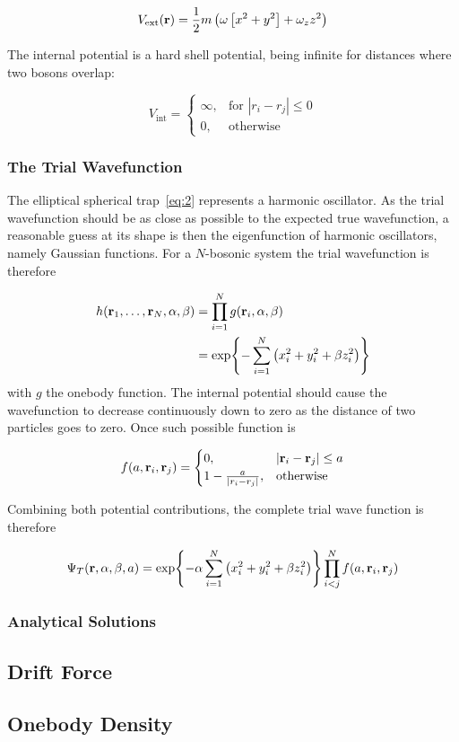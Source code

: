 \begin{equation}
  \label{eq:2}
  V_{\text{ext}}(\vb{r}) = \frac{1}{2}m\left( \omega\left[ x^{2} + y^{2} \right] + \omega_{z}z^{2} \right)
\end{equation}

The internal potential is a hard shell potential, being infinite for distances
where two bosons overlap:

\begin{equation*}
  V_{\text{int}} = \begin{cases}
    \infty, &\text{for } |r_{i} - r_{j}| \le 0\\
    0, &\text{otherwise}
    \end{cases}
\end{equation*}

\subsubsection{The Trial Wavefunction}

The elliptical spherical trap~\eqref{eq:2} represents a harmonic oscillator. As
the trial wavefunction should be as close as possible to the expected true
wavefunction, a reasonable guess at its shape is then the eigenfunction of
harmonic oscillators, namely Gaussian functions. For a \(N\)-bosonic system the
trial wavefunction is therefore

\begin{align*}
  h(\vb{r}_{1}, \ldots, \vb{r}_{N}, \alpha, \beta) &= \prod_{i=1}^{N}g(\vb{r}_{i}, \alpha, \beta)\\
  &= \exp{-\sum_{i=1}^{N}\left( x_{i}^{2} + y_{i}^{2}+\beta z_{i}^{2} \right)}
\end{align*}
with \(g\) the onebody function.
The internal potential should cause the wavefunction to decrease continuously
down to zero as the distance of two particles goes to zero. Once such possible
function is

\begin{equation*}
  f(a, \vb{r}_{i}, \vb{r}_{j}) = \begin{cases}
    0, &|\vb{r}_{i} - \vb{r}_{j}| \le a\\
    1 - \frac{a}{\abs{r_{i}-r_{j}}}, &\text{otherwise}
    \end{cases}
\end{equation*}

Combining both potential contributions, the complete trial wave function is
therefore

\begin{equation*}
  \Psi_{T}(\vb{r}, \alpha, \beta, a) = \exp{-\alpha\sum_{i=1}^{N}\left( x_{i}^{2} + y^{2}_{i} + \beta z^{2}_{i} \right)}
  \prod_{i<j}^{N}f(a, \vb{r}_{i}, \vb{r}_{j})
\end{equation*}

\subsubsection{Analytical Solutions}



\subsection{Drift Force}
\subsection{Onebody Density}
